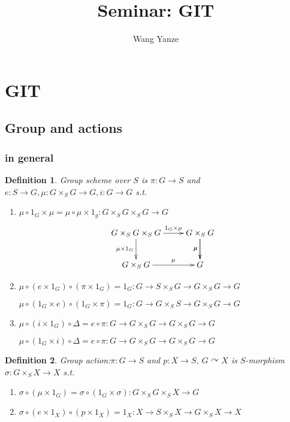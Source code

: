 \documentclass{article}
\title{Seminar: GIT}
\author{Wang Yanze}
\date{}
\newtheorem{defn}{Definition}[section]
\begin{document}
\maketitle

\section{GIT}
\subsection{Group and actions}
\subsubsection{in general}
\begin{defn}
	Group scheme over $ S $ is $ \pi:G\to S $ and $ e:S\to G,\mu:G\times_S G \to G,i:G\to G$ s.t.
	\begin{enumerate}
		\item $ \mu\circ 1_G\times \mu=\mu \circ\mu\times 1_g:G\times_S G\times_S G\to G $
		$$\xymatrix{
			G\times_S G\times_S G\ar[d]_-{\mu \times 1_G}\ar[r]^-{1_G\times \mu} & G\times_S  G\ar[d]_-{\mu} \ar[d]_-{\mu}\\
			G\times_S G\ar[r]^-{\mu} & G 
		}$$
		\item $ \mu \circ (e \times1_G )\circ (\pi \times 1_G)=1_G:G\to S\times_S G\to G\times_S G\to G $
		
		$ \mu \circ (1_G \times e)\circ ( 1_G\times \pi)=1_G:G\to G\times_S S\to G\times_S G\to G $
		\item $ \mu \circ (i \times 1_G ) \circ \Delta=e\circ \pi : G\to G\times_S G\to G\times_S G \to G$ 
		
		$ \mu \circ ( 1_G\times i ) \circ \Delta=e\circ \pi : G\to G\times_S G\to G\times_S G \to G $
	\end{enumerate}
\end{defn}

\begin{defn}
	Group action:$ \pi :G\to S $ and $p: X\to S $, $ G\curvearrowright X  $ is $ S $-morphism $ \sigma :G\times_S X\to X $ s.t.
	\begin{enumerate}
		\item $ \sigma \circ (\mu \times 1_G)=\sigma \circ ( 1_G\times\sigma  ):G\times_S G\times_S X\to G $
		\item $ \sigma \circ (e\times 1_X)\circ (p\times 1_X)=1_X:X\to S\times_S X \to G\times_S X \to X $
	\end{enumerate}
\end{defn}
\end{document}
